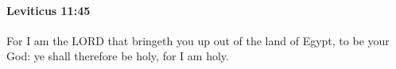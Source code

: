 
		\paragraph{Leviticus 11:45} %
			\label{LEVITICUS-11-45}

			For I am the LORD that bringeth you up out of the land of Egypt, to be your God: ye shall therefore be holy, for I am holy.


